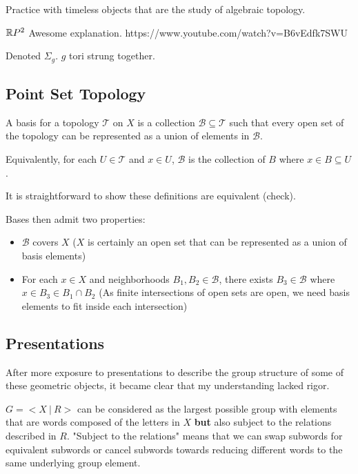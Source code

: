 \documentclass[10pt]{article}
\begin{document}
Practice with timeless objects that are the study of algebraic topology.

\begin{note}
	$\mathbb{R} P^2$
Awesome explanation. https://www.youtube.com/watch?v=B6vEdfk7SWU
\end{note}

\begin{note}
Denoted $\Sigma_g$. $g$ tori strung together.
\end{note}

\subsection{Point Set Topology}

\begin{definition}[Basis]

	A basis for a topology $\mathscr{T}$ on $X$ is a collection $\mathscr{B}
	\subseteq \mathscr{T}$ such that every open set of the topology can be
	represented as a union of elements in $\mathscr{B}$.

	Equivalently, for each $U \in \mathscr{T}$ and $x \in U$, $\mathscr{B}$
	is the collection of $B$ where $x \in B \subseteq U$.

\end{definition}

It is straightforward to show these definitions are equivalent (check).

Bases then admit two properties:
\begin{itemize}
	\item{$\mathscr{B}$ covers $X$ ($X$ is certainly an open set that can be
		represented as a union of basis elements)}
\item{For each $x \in X$ and neighborhoods $B_1, B_2 \in \mathscr{B}$, there exists $B_3 \in
	\mathscr{B}$ where $x \in B_3 \in B_1 \cap B_2$ (As finite intersections of
open sets are open, we need basis elements to fit inside each intersection)}
\end{itemize}

\subsection{Presentations}

After more exposure to presentations to describe the group structure of some of
these geometric objects, it became clear that my understanding lacked rigor.

$G = <X~|~R>$ can be considered as the largest possible group with elements
that are words composed of the letters in $X$ \textbf{but} also subject to the
relations described in $R$. "Subject to the relations" means that we can swap
subwords for equivalent subwords or cancel subwords towards reducing different
words to the same underlying group element. 
\end{document}

